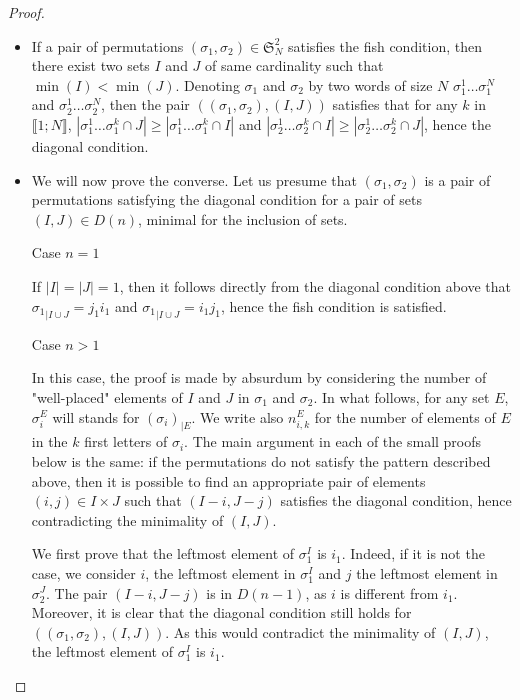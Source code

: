 \documentclass{amsart}
\theoremstyle{definition}
\begin{document}
\begin{proof}
\begin{itemize}
\item If a pair of permutations $(\sigma_1, \sigma_2) \in   \mathfrak{S}_N^2$ satisfies the fish condition, then there exist two sets $I$ and $J$ of same cardinality such that $\min(I)<\min(J)$. Denoting $\sigma_1$ and $\sigma_2$ by two words of size $N$ $\sigma_1^1 \ldots \sigma_1^N$ and $\sigma_2^1 \ldots \sigma_2^N$, then the pair $((\sigma_1, \sigma_2), (I,J))$ satisfies that for any $k$ in $\llbracket 1;N\rrbracket$, $|\sigma_1^1 \ldots \sigma_1^k \cap J| \geq |\sigma_1^1 \ldots \sigma_1^k \cap I|$ and $|\sigma_2^1 \ldots \sigma_2^k \cap I| \geq |\sigma_2^1 \ldots \sigma_2^k \cap J|$, hence the diagonal condition.
\item We will now prove the converse. Let us presume that $(\sigma_1, \sigma_2)$ is a pair of permutations satisfying the diagonal condition for a pair of sets $(I,J) \in D(n)$, minimal for the inclusion of sets.
\begin{description}
\item[Case $n=1$] 
\end{description}
If $|I|=|J|=1$, then it follows directly from the diagonal condition above that ${\sigma_1}_{| I \cup J}=j_1 i_1$ and ${\sigma_1}_{|I \cup J}=i_1 j_1$, hence the fish condition is satisfied.
\begin{description}
\item[Case $n>1$] 
\end{description}
In this case, the proof is made by absurdum 
by considering the number of "well-placed" elements of $I$ and $J$ in $\sigma_1$ and $\sigma_2$. In what follows, for any set $E$, $\sigma^{E}_i$ will stands for $(\sigma_i)_{|E}$. We write also $n_{i,k}^E$ for the number of elements of $E$ in the $k$ first letters of $\sigma_i$. The main argument in each of the small proofs below is the same: if the permutations do not satisfy the pattern described above, then it is possible to find an appropriate pair of elements $(i,j)\in I \times J$ such that $(I-i,J-j)$ satisfies the diagonal condition, hence  contradicting the minimality of $(I,J)$.

We first prove that the leftmost element of $\sigma^{I}_1$ is $i_1$. Indeed, if it is not the case, we consider $i$, the leftmost element in $\sigma^{I}_1$ and $j$ the leftmost element in $\sigma^{J}_2$. The pair $(I-i,J-j)$ is in $D(n-1)$, as $i$ is different from $i_1$. Moreover, it is clear that the diagonal condition still holds for $((\sigma_1, \sigma_2), (I,J))$. As this would contradict the minimality of $(I,J)$, the leftmost element of $\sigma^{I}_1$ is $i_1$.


\end{itemize}
\end{proof}
\end{document}
